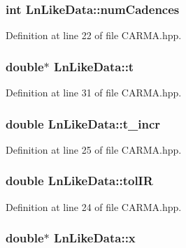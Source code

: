 \hypertarget{struct_ln_like_data_a825ffbe1d96bd9f1c913ed95c83fd8de}{
\subsubsection[{num\-Cadences}]{\setlength{\rightskip}{0pt plus 5cm}int Ln\-Like\-Data\-::num\-Cadences}}\label{struct_ln_like_data_a825ffbe1d96bd9f1c913ed95c83fd8de}


Definition at line 22 of file C\-A\-R\-M\-A.\-hpp.

\hypertarget{struct_ln_like_data_a5b1bf48c4b998b85df9c381974e65f93}{
\subsubsection[{t}]{\setlength{\rightskip}{0pt plus 5cm}double$\ast$ Ln\-Like\-Data\-::t}}\label{struct_ln_like_data_a5b1bf48c4b998b85df9c381974e65f93}


Definition at line 31 of file C\-A\-R\-M\-A.\-hpp.

\hypertarget{struct_ln_like_data_acbb8573027fb54b1d207c126a64c49c9}{
\subsubsection[{t\-\_\-incr}]{\setlength{\rightskip}{0pt plus 5cm}double Ln\-Like\-Data\-::t\-\_\-incr}}\label{struct_ln_like_data_acbb8573027fb54b1d207c126a64c49c9}


Definition at line 25 of file C\-A\-R\-M\-A.\-hpp.

\hypertarget{struct_ln_like_data_a0fcbb2527d414cc2b0fe576a7a61f45c}{
\subsubsection[{tol\-I\-R}]{\setlength{\rightskip}{0pt plus 5cm}double Ln\-Like\-Data\-::tol\-I\-R}}\label{struct_ln_like_data_a0fcbb2527d414cc2b0fe576a7a61f45c}


Definition at line 24 of file C\-A\-R\-M\-A.\-hpp.

\hypertarget{struct_ln_like_data_afd71e6e5c9f90880038586d6f4e705fe}{
\subsubsection[{x}]{\setlength{\rightskip}{0pt plus 5cm}double$\ast$ Ln\-Like\-Data\-::x}}\label{struct_ln_like_data_afd71e6e5c9f90880038586d6f4e705fe}


